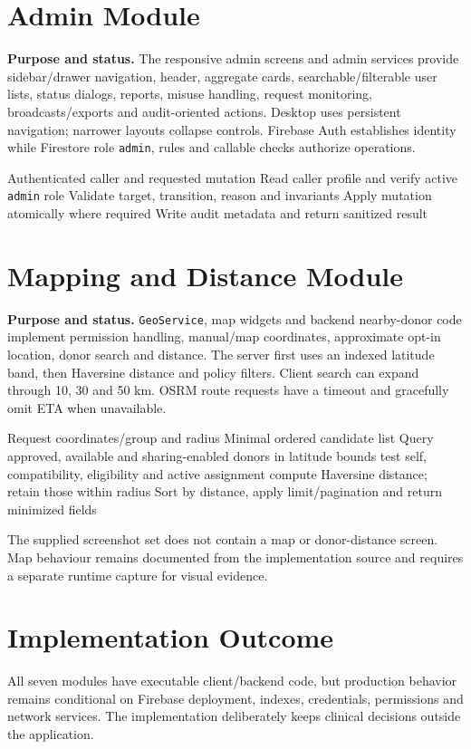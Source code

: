\section{Admin Module}
\textbf{Purpose and status.} The responsive admin screens and admin services provide sidebar/drawer navigation, header, aggregate cards, searchable/filterable user lists, status dialogs, reports, misuse handling, request monitoring, broadcasts/exports and audit-oriented actions. Desktop uses persistent navigation; narrower layouts collapse controls. Firebase Auth establishes identity while Firestore role \texttt{admin}, rules and callable checks authorize operations.
\begin{algorithm}[H]\caption{Execute an administrative action}\begin{algorithmic}[1]
\Require Authenticated caller and requested mutation
\State Read caller profile and verify active \texttt{admin} role
\State Validate target, transition, reason and invariants
\State Apply mutation atomically where required
\State Write audit metadata and return sanitized result
\end{algorithmic}\end{algorithm}

\section{Mapping and Distance Module}
\textbf{Purpose and status.} \texttt{GeoService}, map widgets and backend nearby-donor code implement permission handling, manual/map coordinates, approximate opt-in location, donor search and distance. The server first uses an indexed latitude band, then Haversine distance and policy filters. Client search can expand through 10, 30 and 50 km. OSRM route requests have a timeout and gracefully omit ETA when unavailable.
\begin{algorithm}[H]\caption{Find nearby eligible donors}\begin{algorithmic}[1]
\Require Request coordinates/group and radius \Ensure Minimal ordered candidate list
\State Query approved, available and sharing-enabled donors in latitude bounds
 \State test self, compatibility, eligibility and active assignment
\State compute Haversine distance; retain those within radius \EndFor
\State Sort by distance, apply limit/pagination and return minimized fields
\end{algorithmic}\end{algorithm}
The supplied screenshot set does not contain a map or donor-distance screen. Map behaviour remains documented from the implementation source and requires a separate runtime capture for visual evidence.

\section{Implementation Outcome}
All seven modules have executable client/backend code, but production behavior remains conditional on Firebase deployment, indexes, credentials, permissions and network services. The implementation deliberately keeps clinical decisions outside the application.

